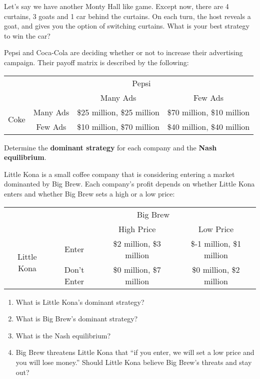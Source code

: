 \begin{problem}
Let's say we have another Monty Hall like game. Except now, there are 4 curtains, 3 goats and 1 car behind the curtains. On each turn, the host reveals a goat, and gives you the option of switching curtains. What is your best strategy to win the car?
\end{problem}

\begin{problem}
Pepsi and Coca-Cola are deciding whether or not to increase their advertising campaign. Their payoff matrix is described by the following:

\begin{center}
\renewcommand{\arraystretch}{1.5} %
\begin{tabular}{cc|c|c}
     &\multicolumn{3}{c}{Pepsi} \\
     && Many Ads & Few Ads \\
     \cline{2-4}
     \multirow{2}{*}{Coke}&Many Ads & \$25 million, \$25 million & \$70 million, \$10 million \\
     &Few Ads & \$10 million, \$70 million & \$40 million, \$40 million
\end{tabular}
\end{center}

Determine the \textbf{dominant strategy} for each company and the \textbf{Nash equilibrium}.
\end{problem}

\begin{problem}
Little Kona is a small coffee company that is considering entering a market dominanted by Big Brew. Each company's profit depends on whether Little Kona enters and whether Big Brew sets a high or a low price:

\begin{center}
\renewcommand{\arraystretch}{1.5} %
\begin{tabular}{cc|c|c}
     &\multicolumn{3}{c}{Big Brew} \\
     && High Price & Low Price \\
     \cline{2-4}
     \multirow{2}{*}{Little Kona}&Enter & \$2 million, \$3 million & \$-1 million, \$1 million \\
     &Don't Enter & \$0 million, \$7 million & \$0 million, \$2 million
\end{tabular}
\end{center}

\begin{enumerate}[label=\alph*)]
    \item What is Little Kona's dominant strategy?
    \item What is Big Brew's dominant strategy?
    \item What is the Nash equilibrium?
    \item Big Brew threatens Little Kona that ``if you enter, we will set a low price and you will lose money.'' Should Little Kona believe Big Brew's threats and stay out?
\end{enumerate}
\end{problem}

